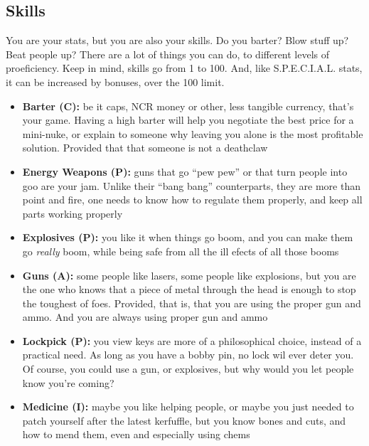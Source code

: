 \documentclass[11pt]{article} %
\begin{document}
\subsection{Skills}

You are your stats, but you are also your skills. Do you barter? Blow stuff up? Beat people up? There are a lot of things you can do, to different levels of proeficiency. Keep in mind, skills go from 1 to 100. And, like S.P.E.C.I.A.L. stats, it can be increased by bonuses, over the 100 limit.

\begin{itemize}
\item \textbf{Barter (C):} be it caps, NCR money or other, less tangible currency, that's your game. Having a high barter will help you negotiate the best price for a mini-nuke, or explain to someone why leaving you alone is the most profitable solution. Provided that that someone is not a deathclaw

\item \textbf{Energy Weapons (P):} guns that go ``pew pew'' or that turn people into goo are your jam. Unlike their ``bang bang'' counterparts, they are more than point and fire, one needs to know how to regulate them properly, and keep all parts working properly

\item \textbf{Explosives (P):} you like it when things go boom, and you can make them go \textit{really} boom, while being safe from all the ill efects of all those booms

\item \textbf{Guns (A):} some people like lasers, some people like explosions, but you are the one who knows that a piece of metal through the head is enough to stop the toughest of foes. Provided, that is, that you are using the proper gun and ammo. And you are always using proper gun and ammo

\item \textbf{Lockpick (P):} you view keys are more of a philosophical choice, instead of a practical need. As long as you have a bobby pin, no lock wil ever deter you. Of course, you could use a gun, or explosives, but why would you let people know you're coming?

\item \textbf{Medicine (I):} maybe you like helping people, or maybe you just needed to patch yourself after the latest kerfuffle, but you know bones and cuts, and how to mend them, even and especially using chems


\end{itemize}
\end{document}
